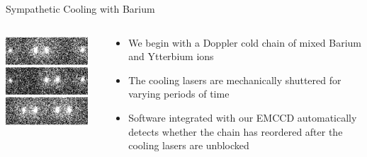 \documentclass{beamer}
\begin{document}
\begin{frame}{Sympathetic Cooling with Barium}
\begin{columns}
	\begin{column}{0.4\textwidth}
		\centerline{\includegraphics[width=0.9\textwidth]{example_data}}
	\end{column}
	\begin{column}{0.6\textwidth}
		\begin{itemize}
			\item We begin with a Doppler cold chain of mixed Barium and Ytterbium ions
			\item The cooling lasers are mechanically shuttered for varying periods of time
			\item Software integrated with our EMCCD automatically detects whether the chain has reordered after the cooling lasers are unblocked
		\end{itemize}
	\end{column}
\end{columns}
\end{frame}
\end{document}
